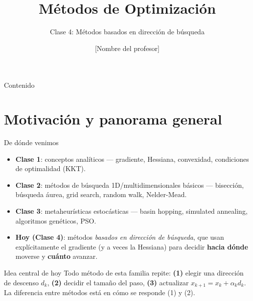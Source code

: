 \documentclass[aspectratio=169]{beamer}
\title{M\'etodos de Optimizaci\'on}
\subtitle{Clase 4: M\'etodos basados en direcci\'on de b\'usqueda}
\author{[Nombre del profesor]}
\institute{[Nombre de la universidad / programa]}
\date{}
\begin{document}
\maketitle

\begin{frame}{Contenido}
  \tableofcontents
\end{frame}

\section{Motivaci\'on y panorama general}

\begin{frame}{De d\'onde venimos}
  \begin{itemize}
    \item \textbf{Clase 1}: conceptos anal\'iticos --- gradiente, Hessiana, convexidad, condiciones de optimalidad (KKT).
    \item \textbf{Clase 2}: m\'etodos de b\'usqueda 1D/multidimensionales b\'asicos --- bisecci\'on, b\'usqueda \'aurea, grid search, random walk, Nelder-Mead.
    \item \textbf{Clase 3}: metaheur\'isticas estoc\'asticas --- basin hopping, simulated annealing, algoritmos gen\'eticos, PSO.
    \item \textbf{Hoy (Clase 4)}: m\'etodos \emph{basados en direcci\'on de b\'usqueda}, que usan expl\'icitamente el gradiente (y a veces la Hessiana) para decidir \textbf{hacia d\'onde} moverse y \textbf{cu\'anto} avanzar.
  \end{itemize}
  \begin{alertblock}{Idea central de hoy}
    Todo m\'etodo de esta familia repite: \textbf{(1)} elegir una direcci\'on de descenso $d_k$, \textbf{(2)} decidir el tama\~no del paso, \textbf{(3)} actualizar $x_{k+1} = x_k + \alpha_k d_k$. La diferencia entre m\'etodos est\'a en c\'omo se responde (1) y (2).
  \end{alertblock}
\end{frame}
\end{document}
